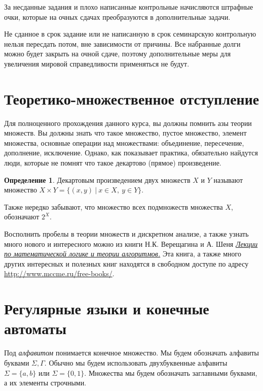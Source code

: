 \documentclass[12pt]{article}
\theoremstyle{definiton}
\theoremstyle{definition}
\theoremstyle{definition}
\newtheorem{Def}{Определение}
\begin{document}
	За несданные задания и плохо написанные контрольные начисляются штрафные очки, которые на очных сдачах преобразуются в дополнительные задачи.
	
	Не сданное в срок задание или не написанную в срок семинарскую контрольную нельзя пересдать потом, вне зависимости от причины. Все набранные долги можно будет закрыть на очной сдаче, поэтому дополнительные меры для увеличения мировой справедливости применяться не будут.

	\section{Теоретико-множественное отступление}

	Для полноценного прохождения данного курса, вы должны помнить азы теории множеств. Вы должны знать что такое множество, пустое множество, элемент множества, основные операции над множествами: объединение, пересечение, дополнение, исключение. Однако, как показывает практика, обязательно найдутся люди, которые не помнят что такое декартово (прямое) произведение.

	\begin{Def}
		Декартовым произведением двух множеств $X$ и $Y$ называют множество $X \times Y = \{ (x,y)\ |\ x \in X,\ y \in Y \}$.

	\end{Def}

	Также нередко забывают, что множество всех подмножеств множества $X$, обозначают $2^X$.


	Восполнить пробелы в теории множеств и дискретном анализе, а также узнать много нового и интересного можно из книги Н.К. Верещагина и А. Шеня \emph{\href{http://www.mccme.ru/free-books/shen/shen-logic-part1-2.pdf}{Лекции по математической логике и теории алгоритмов.} }Эта книга, а также много других интересных и полезных книг находятся в свободном доступе по адресу \url{http://www.mccme.ru/free-books/}.

	\section{ Регулярные языки и конечные автоматы }

	 Под \emph{алфавитом} понимается конечное множество. Мы будем обозначать алфавиты буквами $\Sigma, \Gamma$. Обычно мы будем использовать двухбуквенные алфавиты $\Sigma = \{a, b\}$ или  $\Sigma = \{0, 1\}$. Множества мы будем обозначать заглавными буквами, а их элементы строчными. 
\end{document}
